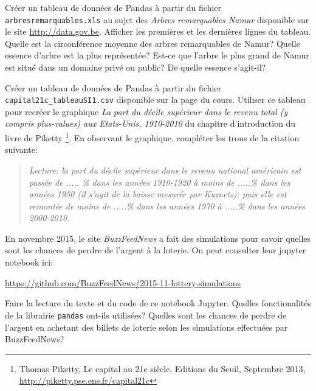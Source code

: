 \begin{exercice}
Créer un tableau de données de Pandas à partir du fichier
\texttt{arbresremarquables.xls} au sujet des \emph{Arbres remarquables Namur}
disponible sur le site \url{http://data.gov.be}. 
Afficher les premières et les dernières lignes du tableau. Quelle est la
circonférence moyenne des arbres remarquables de Namur? Quelle essence d'arbre
est la plus représentée? Est-ce que l'arbre le plus grand de Namur est situé
dans un domaine privé ou public? De quelle essence s'agit-il?
\end{exercice}

\begin{exercice}
Créer un tableau de données de Pandas à partir du
fichier \texttt{capital21c\_tableauSI1.csv} disponible sur la page du cours.
Utiliser ce tableau pour recréer le
graphique \emph{La part du décile supérieur dans le revenu total (y compris
plus-values) aux Etats-Unis, 1910-2010}
du chapitre d'introduction du livre de Piketty
\footnote{Thomas Piketty,
Le capital au 21e siècle,
Editions du Seuil, Septembre 2013, \url{http://piketty.pse.ens.fr/capital21c}}.
En observant le graphique, compléter les trous de la citation suivante:
\begin{quote}
\it
Lecture: la part du décile supérieur dans le revenu national américain est
passée de ..... \% dans les années 1910-1920 à moins de .....\% dans les années 1950
(il s'agit de la baisse mesurée par Kuznets); puis elle est remontée de moins de
.....\% dans les années 1970 à .....\% dans les années 2000-2010.
\end{quote}
\end{exercice}


\begin{exercice}[La lotterie]
En novembre 2015, le site \emph{BuzzFeedNews} a fait des simulations pour savoir
quelles sont les chances de perdre de l'argent à la loterie. On peut consulter
leur jupyter notebook ici:
\begin{center}
\url{https://github.com/BuzzFeedNews/2015-11-lottery-simulations}
\end{center}
Faire la lecture du texte et du code de ce notebook Jupyter.
Quelles fonctionalités de la librairie \texttt{pandas} ont-ils utilisées?
Quelles sont les chances de perdre de l'argent en achetant des billets de
loterie selon les simulations effectuées par BuzzFeedNews?
\end{exercice}

